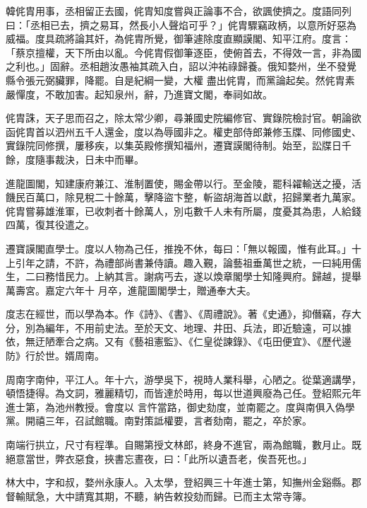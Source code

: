 \begin{pinyinscope}
 韓侂胄用事，丞相留正去國，侂胄知度嘗與正論事不合，欲諷使擠之。度語同列曰：「丞相已去，擠之易耳，然長小人聲焰可乎？」侂胄驟竊政柄，以意所好惡為威福。度具疏將論其奸，為侂胄所覺，御筆遽除度直顯謨閣、知平江府。度言：「蔡京擅權，天下所由以亂。今侂胄假御筆逐臣，使俯首去，不得效一言，非為國之利也。」固辭。丞相趙汝愚袖其疏入白，詔以沖祐祿歸養。俄知婺州，坐不發覺縣令張元弼臟罪，降罷。自是紀綱一變，大權
 盡出侂胄，而黨論起矣。然侂胄素嚴憚度，不敢加害。起知泉州，辭，乃進寶文閣，奉祠如故。



 侂胄誅，天子思而召之，除太常少卿，尋兼國史院編修官、實錄院檢討官。朝論欲函侂胄首以泗州五千人還金，度以為辱國非之。權吏部侍郎兼修玉牒、同修國史、實錄院同修撰，屢移疾，以集英殿修撰知福州，遷寶謨閣待制。始至，訟牒日千餘，度隨事裁決，日未中而畢。



 進龍圖閣，知建康府兼江、淮制置使，賜金帶以行。至金陵，罷科糴輸送之擾，活
 饑民百萬口，除見稅二十餘萬，擊降盜卞整，斬盜胡海首以獻，招歸業者九萬家。侂胄嘗募雄淮軍，已收刺者十餘萬人，別屯數千人未有所屬，度憂其為患，人給錢四萬，復其役遣之。



 遷寶謨閣直學士。度以人物為己任，推挽不休，每曰：「無以報國，惟有此耳。」十上引年之請，不許，為禮部尚書兼侍讀。趣入覲，論藝祖垂萬世之統，一曰純用儒生，二曰務惜民力。上納其言。謝病丐去，遂以煥章閣學士知隆興府。歸越，提舉萬壽宮。嘉定六年十
 月卒，進龍圖閣學士，贈通奉大夫。



 度志在經世，而以學為本。作《詩》、《書》、《周禮說》。著《史通》，抑僭竊，存大分，別為編年，不用前史法。至於天文、地理、井田、兵法，即近驗遠，可以據依，無迂陋牽合之病。又有《藝祖憲監》、《仁皇從諫錄》、《屯田便宜》、《歷代邊防》行於世。婿周南。



 周南字南仲，平江人。年十六，游學吳下，視時人業科舉，心陋之。從葉適講學，頓悟捷得。為文詞，雅麗精切，而皆達於時用，每以世道興廢為己任。登紹熙元年進士第，為池州教授。會度以
 言忤當路，御史劾度，並南罷之。度與南俱入偽學黨。開禧三年，召試館職。南對策詆權要，言者劾南，罷之，卒於家。



 南端行拱立，尺寸有程準。自賜第授文林郎，終身不進官，兩為館職，數月止。既絕意當世，弊衣惡食，挾書忘晝夜，曰：「此所以遺吾老，俟吾死也。」



 林大中，字和叔，婺州永康人。入太學，登紹興三十年進士第，知撫州金谿縣。郡督輸賦急，大中請寬其期，不聽，納告敕投劾而歸。已而主太常寺簿。




\end{pinyinscope}
